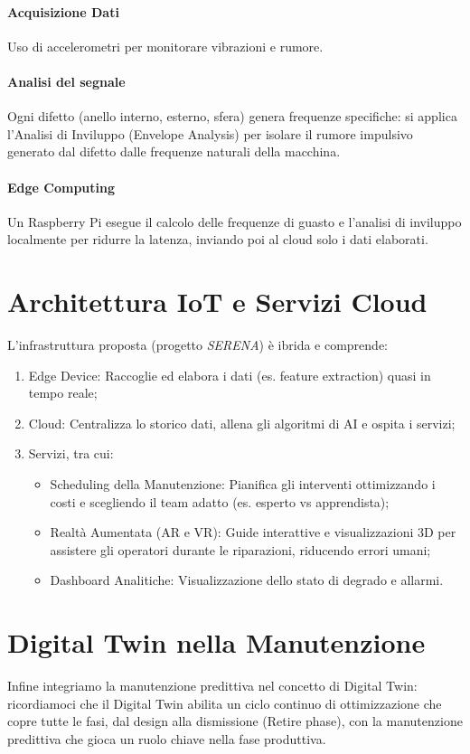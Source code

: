 \paragraph{Acquisizione Dati} Uso di accelerometri per monitorare vibrazioni e rumore.
%
\paragraph{Analisi del segnale} Ogni difetto (anello interno, esterno, sfera) genera frequenze specifiche: si applica l'Analisi di Inviluppo (Envelope Analysis) per isolare il rumore impulsivo generato dal difetto dalle frequenze naturali della macchina.
%
\paragraph{Edge Computing} Un Raspberry Pi esegue il calcolo delle frequenze di guasto e l'analisi di inviluppo localmente per ridurre la latenza, inviando poi al cloud solo i dati elaborati.

%
\section{Architettura IoT e Servizi Cloud}
L'infrastruttura proposta (progetto \emph{SERENA}) è ibrida e comprende:
\begin{enumerate}
    \item Edge Device: Raccoglie ed elabora i dati (es. feature extraction) quasi in tempo reale;
    \item Cloud: Centralizza lo storico dati, allena gli algoritmi di AI e ospita i servizi;
    \item Servizi, tra cui:
          \begin{itemize}
              \item Scheduling della Manutenzione: Pianifica gli interventi ottimizzando i costi e scegliendo il team adatto (es. esperto vs apprendista);
              \item Realtà Aumentata (AR e VR): Guide interattive e visualizzazioni 3D per assistere gli operatori durante le riparazioni, riducendo errori umani;
              \item Dashboard Analitiche: Visualizzazione dello stato di degrado e allarmi.
          \end{itemize}
\end{enumerate}

%
\section{Digital Twin nella Manutenzione}
Infine integriamo la manutenzione predittiva nel concetto di Digital Twin: ricordiamoci che il Digital Twin abilita un ciclo continuo di ottimizzazione che copre tutte le fasi, dal design alla dismissione (Retire phase), con la manutenzione predittiva che gioca un ruolo chiave nella fase produttiva.
